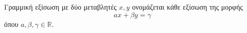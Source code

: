 Γραμμική εξίσωση με δύο μεταβλητές $x,y$ ονομάζεται κάθε εξίσωση της μορφής
\[ ax+\beta y=\gamma \]
όπου $ a,\beta,\gamma\in\mathbb{R} $.
